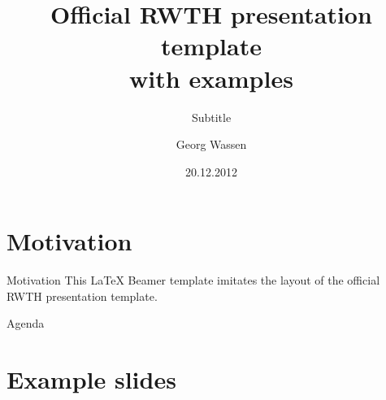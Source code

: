 \documentclass[]{beamer}
\title[RWTH presentation template]{Official RWTH presentation template\\with examples}
\subtitle{Subtitle}
\author{Georg Wassen}
\institute{Lehrstuhl für Betriebssysteme}
\date{20.12.2012}
\begin{document}

\section*{Motivation}



\begin{frame}{Motivation}
  This \LaTeX{} Beamer template imitates the layout of the official RWTH presentation template.
\end{frame}

\begin{frame}{Agenda}
  \tableofcontents
\end{frame}

\section{Example slides}
\end{document}
